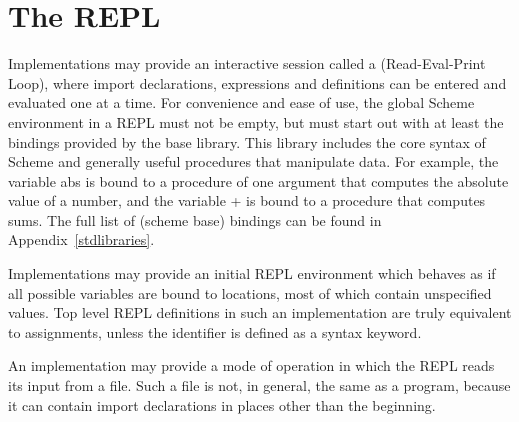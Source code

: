 \section{The REPL}

Implementations may provide an interactive session called a
 (Read-Eval-Print Loop), where import declarations,
expressions and definitions can be
entered and evaluated one at a time.  For convenience and ease of use,
the global Scheme environment in a REPL
must not be empty, but must start out with at least the bindings provided by the
base library.  This library includes the core syntax of Scheme
and generally useful procedures that manipulate data.  For example, the
variable {\cf abs} is bound to a
procedure of one argument that computes the absolute value of a
number, and the variable {\cf +} is bound to a procedure that computes
sums.  The full list of {\cf(scheme base)} bindings can be found in
Appendix~\ref{stdlibraries}.

Implementations may provide an initial REPL environment
which behaves as if all possible variables are bound to locations, most of
which contain unspecified values.  Top level REPL definitions in
such an implementation are truly equivalent to assignments,
unless the identifier is defined as a syntax keyword.

An implementation may provide a mode of operation in which the REPL
reads its input from a file.  Such a file is not, in general, the same
as a program, because it can contain import declarations in places other than
the beginning.

